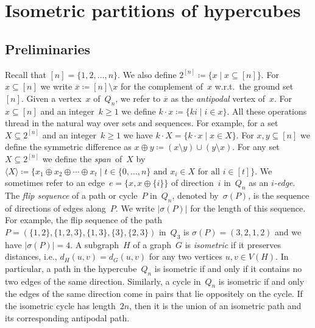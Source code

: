 \documentclass[11pt]{article}
\newcommand{\defi}[1]{\textcolor{defblue}{\emph{#1}}}
\newcommand{\ass}{\coloneqq}
\newcommand{\ol}{\overline}
\newcommand{\seq}{\subseteq}
\begin{document}
\section{Isometric partitions of hypercubes}
%
\subsection{Preliminaries}
%
Recall that $[n]=\{1,2,\ldots,n\}$.
We also define $2^{[n]}\ass\{x\mid x\seq [n]\}$.
For $x\seq [n]$ we write $\ol{x}\ass[n]\setminus x$ for the complement of~$x$ w.r.t.\ the ground set~$[n]$.
Given a vertex~$x$ of~$Q_n$, we refer to $\ol{x}$ as the \defi{antipodal} vertex of~$x$.
For $x\seq [n]$ and an integer~$k\geq 1$ we define $k\cdot x\ass\{ki\mid i\in x\}$.
All these operations thread in the natural way over sets and sequences.
For example, for a set~$X\seq 2^{[n]}$ and an integer~$k\geq 1$ we have $k\cdot X=\{k\cdot x\mid x\in X\}$.
%
For $x,y\seq [n]$ we define the symmetric difference as $x\oplus y\ass(x\setminus y)\cup (y\setminus x)$.
For any set $X\seq 2^{[n]}$ we define the \defi{span}~of~$X$ by $\langle X\rangle\ass\{x_1\oplus x_2\oplus \cdots\oplus x_t\mid t\in\{0,\ldots,n\}\text{ and } x_i\in X\text{ for all }i\in[t]\}$.
%
We sometimes refer to an edge~$e=\{x,x\oplus\{i\}\}$ of direction~$i$ in~$Q_n$ as an \defi{$i$-edge}.
The \defi{flip sequence} of a path or cycle~$P$ in~$Q_n$, denoted by~$\sigma(P)$, is the sequence of directions of edges along~$P$.
We write $|\sigma(P)|$ for the length of this sequence.
For example, the flip sequence of the path~$P=(\{1,2\},\{1,2,3\},\{1,3\},\{3\},\{2,3\})$ in~$Q_3$ is $\sigma(P)=(3,2,1,2)$ and we have $|\sigma(P)|=4$.
%
A subgraph~$H$ of a graph~$G$ is \defi{isometric} if it preserves distances, i.e., $d_H(u,v)=d_G(u,v)$ for any two vertices $u,v \in V(H)$.
In particular, a path in the hypercube~$Q_n$ is isometric if and only if it contains no two edges of the same direction.
Similarly, a cycle in~$Q_n$ is isometric if and only the edges of the same direction come in pairs that lie oppositely on the cycle.
If the isometric cycle has length~$2n$, then it is the union of an isometric path and its corresponding antipodal path.
%
\end{document}
